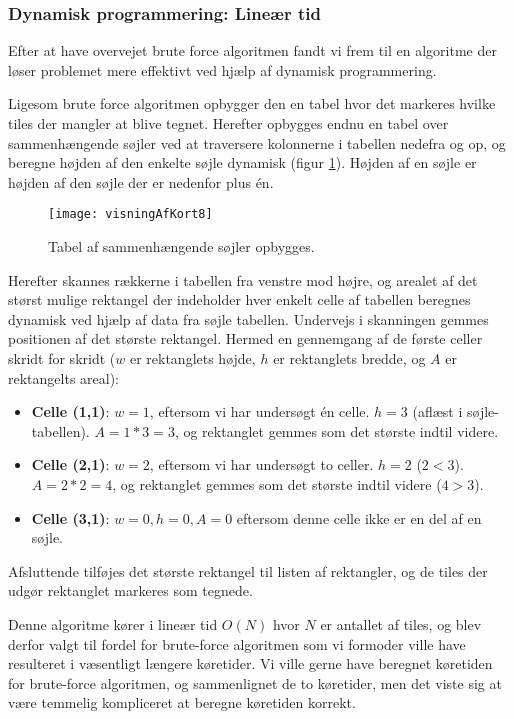 \subsubsection{Dynamisk programmering: Lineær tid}
\label{subsec:dynamiskProgrammering}

Efter at have overvejet brute force algoritmen fandt vi frem til en algoritme der løser problemet mere effektivt ved hjælp af dynamisk programmering. 

Ligesom brute force algoritmen opbygger den en tabel hvor det markeres hvilke tiles der mangler at blive tegnet. Herefter opbygges endnu en tabel over sammenhængende søjler ved at traversere kolonnerne i tabellen nedefra og op, og beregne højden af den enkelte søjle dynamisk (figur \ref{figur:visningAfKort8}). Højden af en søjle er højden af den søjle der er nedenfor plus én.

\begin{figure}[h]
	\centering
	\texttt{[image: visningAfKort8]}
	\captionsetup{width=0.8\textwidth}
	\caption{Tabel af sammenhængende søjler opbygges.}
	\label{figur:visningAfKort8}
\end{figure}

Herefter skannes rækkerne i tabellen fra venstre mod højre, og arealet af det størst mulige rektangel der indeholder hver enkelt celle af tabellen beregnes dynamisk ved hjælp af data fra søjle tabellen. Undervejs i skanningen gemmes positionen af det største rektangel. Hermed en gennemgang af de første celler skridt for skridt ($w$ er rektanglets højde, $h$ er rektanglets bredde, og $A$ er rektangelts areal):

\begin{itemize}
	\item \textbf{Celle (1,1)}: $w = 1$, eftersom vi har undersøgt én celle. $h = 3$ (aflæst i søjle-tabellen). $A = 1 * 3 = 3$, og rektanglet gemmes som det største indtil videre.
	\item \textbf{Celle (2,1)}: $w = 2$, eftersom vi har undersøgt to celler. $h = 2$ ($2 < 3$). $A = 2 * 2 = 4$, og rektanglet gemmes som det største indtil videre ($4 > 3$).
	\item \textbf{Celle (3,1)}: $w = 0, h = 0, A = 0$ eftersom denne celle ikke er en del af en søjle.
\end{itemize}

Afsluttende tilføjes det største rektangel til listen af rektangler, og de tiles der udgør rektanglet markeres som tegnede.

Denne algoritme kører i lineær tid $O(N)$ hvor $N$ er antallet af tiles, og blev derfor valgt til fordel for brute-force algoritmen som vi formoder ville have resulteret i væsentligt længere køretider. Vi ville gerne have beregnet køretiden for brute-force algoritmen, og sammenlignet de to køretider, men det viste sig at være temmelig kompliceret at beregne køretiden korrekt.

